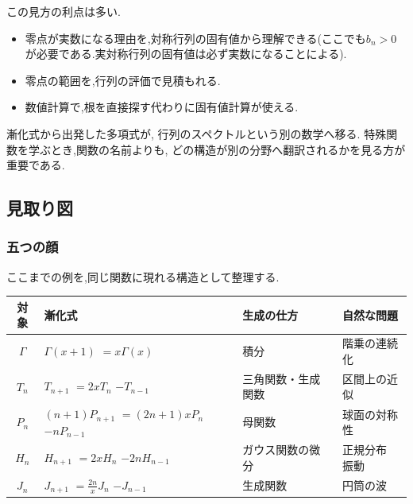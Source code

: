 この見方の利点は多い.

\begin{itemize}
  \item 零点が実数になる理由を,対称行列の固有値から理解できる(ここでも$b_n>0$が必要である.実対称行列の固有値は必ず実数になることによる).
  \item 零点の範囲を,行列の評価で見積もれる.
  \item 数値計算で,根を直接探す代わりに固有値計算が使える.
\end{itemize}

漸化式から出発した多項式が,
行列のスペクトルという別の数学へ移る.
特殊関数を学ぶとき,関数の名前よりも,
どの構造が別の分野へ翻訳されるかを見る方が重要である.

\subsection{見取り図}

\subsubsection{五つの顔}

ここまでの例を,同じ関数に現れる構造として整理する.

\begin{center}
\small
\begin{tabular}{|c|p{2.3cm}|p{1.6cm}|p{2.1cm}|}
  \hline
  対象 & 漸化式 & 生成の仕方 & 自然な問題\\ \hline
  $\Gamma$ & \shortstack[l]{$\Gamma(x+1)$\\$=x\Gamma(x)$}
    & 積分 & 階乗の連続化\\ \hline
  $T_n$ & \shortstack[l]{$T_{n+1}$\\$=2xT_n$\\$-T_{n-1}$}
    & 三角関数・生成関数 & 区間上の近似\\ \hline
  $P_n$ & \shortstack[l]{$(n{+}1)P_{n+1}$\\$=(2n{+}1)xP_n$\\$-nP_{n-1}$}
    & 母関数 & 球面の対称性\\ \hline
  $H_n$ & \shortstack[l]{$H_{n+1}$\\$=2xH_n$\\$-2nH_{n-1}$}
    & ガウス関数の微分 & \shortstack[l]{正規分布\\振動}\\ \hline
  $J_n$ & \shortstack[l]{$J_{n+1}$\\$=\frac{2n}{x}J_n$\\$-J_{n-1}$}
    & 生成関数 & 円筒の波\\ \hline
\end{tabular}
\end{center}

